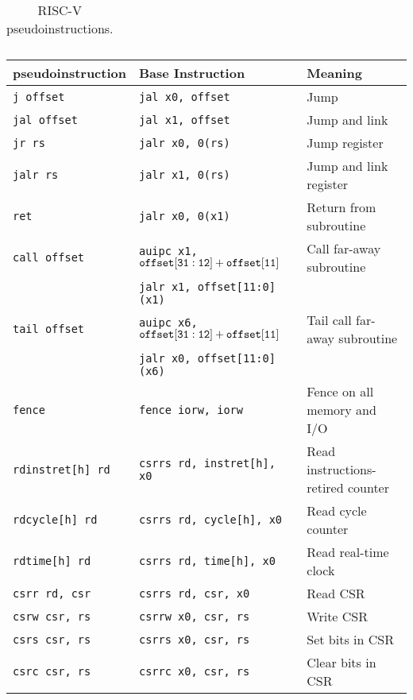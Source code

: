 \begin{table}[h]
\begin{small}
\begin{center}
\begin{tabular}{l l l}
\end{tabular}
\end{center}
\end{small}
\caption{RISC-V pseudoinstructions.}
\label{pseudos}
\end{table}

\begin{table}[h]
\begin{small}
\begin{center}
\begin{tabular}{l l l}
pseudoinstruction & Base Instruction & Meaning \\ \hline

{\tt j offset} & {\tt jal x0, offset} & Jump \\
{\tt jal offset} & {\tt jal x1, offset} & Jump and link \\
{\tt jr rs} & {\tt jalr x0, 0(rs)} & Jump register \\
{\tt jalr rs} & {\tt jalr x1, 0(rs)} & Jump and link register \\
{\tt ret} & {\tt jalr x0, 0(x1)} & Return from subroutine \\
\tt call offset & {\tt auipc x1, ${\tt offset[31:12]} + {\tt offset[11]}$} & Call far-away subroutine \\
                & {\tt jalr x1, offset[11:0](x1)}                          & \\
\tt tail offset & {\tt auipc x6, ${\tt offset[31:12]} + {\tt offset[11]}$} & Tail call far-away subroutine \\
                & {\tt jalr x0, offset[11:0](x6)}                          & \\
\hline
{\tt fence} & {\tt fence iorw, iorw} & Fence on all memory and I/O \\
\hline
{\tt rdinstret[h] rd} & {\tt csrrs rd, instret[h], x0} & Read instructions-retired counter \\
{\tt rdcycle[h] rd} & {\tt csrrs rd, cycle[h], x0} & Read cycle counter \\
{\tt rdtime[h] rd} & {\tt csrrs rd, time[h], x0} & Read real-time clock \\
\hline
{\tt csrr rd, csr} & {\tt csrrs rd, csr, x0} & Read CSR \\
{\tt csrw csr, rs} & {\tt csrrw x0, csr, rs} & Write CSR \\
{\tt csrs csr, rs} & {\tt csrrs x0, csr, rs} & Set bits in CSR \\
{\tt csrc csr, rs} & {\tt csrrc x0, csr, rs} & Clear bits in CSR \\

\end{tabular}
\end{center}
\end{small}
\end{table}
